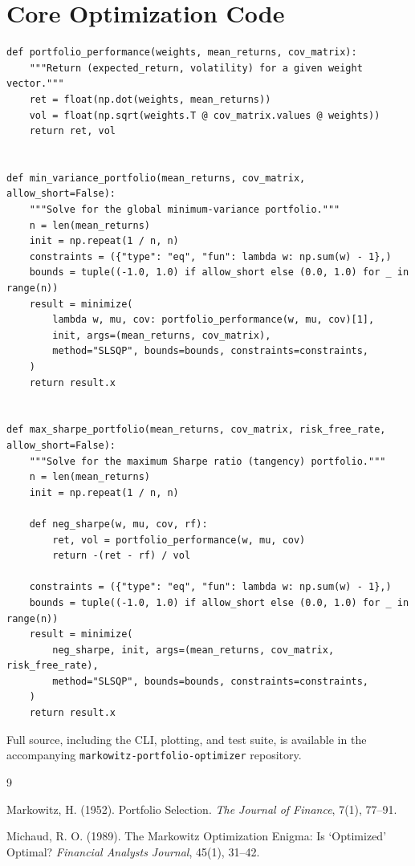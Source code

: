 \documentclass[11pt]{article}
\begin{document}
\section{Core Optimization Code}

\begin{lstlisting}[style=python]
def portfolio_performance(weights, mean_returns, cov_matrix):
    """Return (expected_return, volatility) for a given weight vector."""
    ret = float(np.dot(weights, mean_returns))
    vol = float(np.sqrt(weights.T @ cov_matrix.values @ weights))
    return ret, vol


def min_variance_portfolio(mean_returns, cov_matrix, allow_short=False):
    """Solve for the global minimum-variance portfolio."""
    n = len(mean_returns)
    init = np.repeat(1 / n, n)
    constraints = ({"type": "eq", "fun": lambda w: np.sum(w) - 1},)
    bounds = tuple((-1.0, 1.0) if allow_short else (0.0, 1.0) for _ in range(n))
    result = minimize(
        lambda w, mu, cov: portfolio_performance(w, mu, cov)[1],
        init, args=(mean_returns, cov_matrix),
        method="SLSQP", bounds=bounds, constraints=constraints,
    )
    return result.x


def max_sharpe_portfolio(mean_returns, cov_matrix, risk_free_rate, allow_short=False):
    """Solve for the maximum Sharpe ratio (tangency) portfolio."""
    n = len(mean_returns)
    init = np.repeat(1 / n, n)

    def neg_sharpe(w, mu, cov, rf):
        ret, vol = portfolio_performance(w, mu, cov)
        return -(ret - rf) / vol

    constraints = ({"type": "eq", "fun": lambda w: np.sum(w) - 1},)
    bounds = tuple((-1.0, 1.0) if allow_short else (0.0, 1.0) for _ in range(n))
    result = minimize(
        neg_sharpe, init, args=(mean_returns, cov_matrix, risk_free_rate),
        method="SLSQP", bounds=bounds, constraints=constraints,
    )
    return result.x
\end{lstlisting}

Full source, including the CLI, plotting, and test suite, is available in
the accompanying \texttt{markowitz-portfolio-optimizer} repository.

\begin{thebibliography}{9}

Markowitz, H. (1952). Portfolio Selection. \textit{The Journal of Finance},
7(1), 77--91.

Michaud, R. O. (1989). The Markowitz Optimization Enigma: Is `Optimized'
Optimal? \textit{Financial Analysts Journal}, 45(1), 31--42.

\end{thebibliography}
\end{document}
